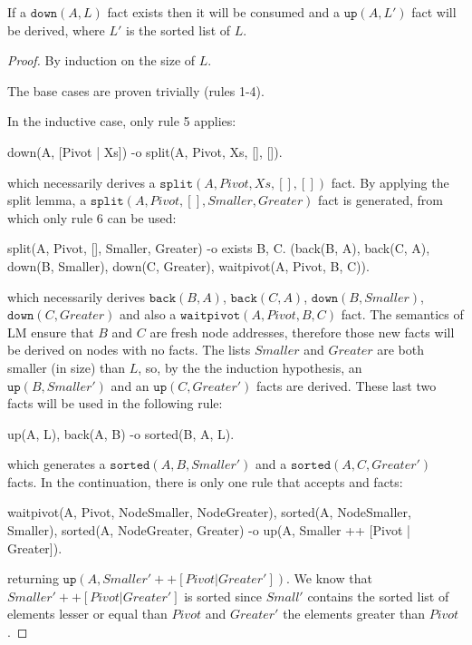 \begin{theorem}

If a $\mathtt{down}(A, L)$ fact exists then it will be consumed and a
$\mathtt{up}(A, L')$ fact will be derived, where $L'$ is the sorted list of $L$.

\end{theorem}
\begin{proof}
By induction on the size of $L$.

The base cases are proven trivially (rules 1-4).

In the inductive case, only rule 5 applies:
\begin{Code}
down(A, [Pivot | Xs]) -o split(A, Pivot, Xs, [], []).
\end{Code}

\noindent which necessarily derives a $\mathtt{split}(A, Pivot, Xs, [], [])$
fact. By applying the split lemma, a $\mathtt{split}(A, Pivot, [], Smaller, Greater)$
fact is generated, from which only rule 6 can be used:

\begin{Code}
split(A, Pivot, [], Smaller, Greater) -o
   exists B, C. (back(B, A), back(C, A),
                 down(B, Smaller), down(C, Greater), waitpivot(A, Pivot, B, C)).
\end{Code}

\noindent which necessarily derives $\mathtt{back}(B, A)$, $\mathtt{back}(C,
A)$, $\mathtt{down}(B, Smaller)$, $\mathtt{down}(C, Greater)$ and also a
$\mathtt{waitpivot}(A, Pivot, B, C)$ fact. The semantics of LM ensure that $B$
and $C$ are fresh node addresses, therefore those new facts will be derived on
nodes with no facts. The lists $Smaller$ and $Greater$ are both smaller (in
size) than $L$, so, by the the induction hypothesis, an $\mathtt{up}(B,
Smaller')$ and an $\mathtt{up}(C, Greater')$ facts are derived. These last two
facts will be used in the following rule:

\begin{Code}
up(A, L), back(A, B) -o sorted(B, A, L).
\end{Code}

\noindent which generates a $\mathtt{sorted}(A, B, Smaller')$ and a $\mathtt{sorted}(A, C,
Greater')$ facts. In the continuation, there is only one rule that accepts
 and  facts:

\begin{Code}
waitpivot(A, Pivot, NodeSmaller, NodeGreater),
sorted(A, NodeSmaller, Smaller),
sorted(A, NodeGreater, Greater)
   -o up(A, Smaller ++ [Pivot | Greater]).
\end{Code}

\noindent returning $\mathtt{up}(A, Smaller' ++ [Pivot | Greater'])$.  We know that
$Smaller' ++ [Pivot | Greater']$ is sorted since $Small'$ contains the sorted
list of elements lesser or equal than $Pivot$ and $Greater'$ the elements
greater than $Pivot$.

\end{proof}

